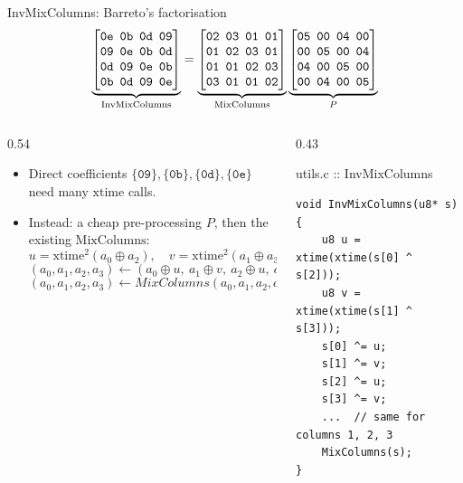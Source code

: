 \documentclass[aspectratio=169,10pt]{beamer}
\newcommand{\xor}{\oplus}
\newcommand{\fn}[1]{\mathrm{#1}}
\newcommand{\hx}[1]{\ensuremath{\mathtt{\{#1\}}}}            %
\newcommand{\hh}[1]{\ensuremath{\mathtt{#1}}}                %
\begin{document}
\begin{frame}[fragile]{InvMixColumns: Barreto's factorisation}
\footnotesize
\[\setlength{\arraycolsep}{2.5pt}
\underbrace{\begin{bmatrix}\hh{0e}&\hh{0b}&\hh{0d}&\hh{09}\\\hh{09}&\hh{0e}&\hh{0b}&\hh{0d}\\\hh{0d}&\hh{09}&\hh{0e}&\hh{0b}\\\hh{0b}&\hh{0d}&\hh{09}&\hh{0e}\end{bmatrix}}_{\text{InvMixColumns}}=
\underbrace{\begin{bmatrix}\hh{02}&\hh{03}&\hh{01}&\hh{01}\\\hh{01}&\hh{02}&\hh{03}&\hh{01}\\\hh{01}&\hh{01}&\hh{02}&\hh{03}\\\hh{03}&\hh{01}&\hh{01}&\hh{02}\end{bmatrix}}_{\text{MixColumns}}
\underbrace{\begin{bmatrix}\hh{05}&\hh{00}&\hh{04}&\hh{00}\\\hh{00}&\hh{05}&\hh{00}&\hh{04}\\\hh{04}&\hh{00}&\hh{05}&\hh{00}\\\hh{00}&\hh{04}&\hh{00}&\hh{05}\end{bmatrix}}_{P}\]
\vskip-4pt
\begin{columns}[T]
\begin{column}{0.54\textwidth}
\begin{itemize}
\item Direct coefficients $\hx{09},\hx{0b},\hx{0d},\hx{0e}$ need many $\fn{xtime}$ calls.
\item Instead: a cheap \alert{pre-processing} $P$, then the existing $\fn{MixColumns}$:
\[ u=\fn{xtime}^2(a_0\xor a_2),\quad v=\fn{xtime}^2(a_1\xor a_3) \]
\[ (a_0,a_1,a_2,a_3)\leftarrow(a_0\xor u,\ a_1\xor v,\ a_2\xor u,\ a_3\xor v) \]
\[ (a_0,a_1,a_2,a_3)\leftarrow MixColumns(a_0, a_1, a_2,a_3) \]
\end{itemize}
\end{column}
\begin{column}{0.43\textwidth}
\begin{tbox}{utils.c :: InvMixColumns}
\begin{lstlisting}
void InvMixColumns(u8* s) {
    u8 u = xtime(xtime(s[0] ^ s[2]));
    u8 v = xtime(xtime(s[1] ^ s[3]));
    s[0] ^= u;
    s[1] ^= v;
    s[2] ^= u;
    s[3] ^= v;
    ...  // same for columns 1, 2, 3
    MixColumns(s);
}
\end{lstlisting}
\end{tbox}
\end{column}
\end{columns}
\end{frame}
\end{document}
